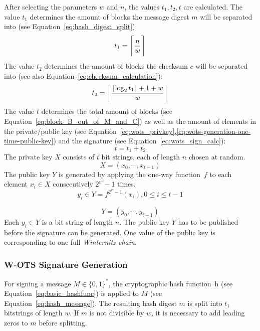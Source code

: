 After selecting the parameters $w$ and $n$, the values $t_1, t_2, t$ are calculated.
The value $t_1$ determines the amount of blocks the message digest $m$ will be separated into (see Equation~\ref{eq:hash_digest_split}):
\begin{equation}
\label{eq:t1}
t_1 = \ceil[\Bigg]{\frac{n}{w}}
\end{equation}
The value $t_2$ determines the amount of blocks the checksum $c$ will be separated into (see also Equation~\ref{eq:checksum_calculation}):
\begin{equation}
\label{eq:t2}
t_2 = \ceil*{\frac{\floor*{\log_2 t_1} + 1 + w}{w} }
\end{equation}
The value $t$ determines the total amount of blocks (see Equation~\ref{eq:block_B_out_of_M_and_C}) as well as the amount of elements in the private/public key (see Equation~\ref{eq:wots_privkey},\ref{eq:wots-generation-one-time-public-key}) and the signature (see Equation~\ref{eq:wots_sign_calc}):
\begin{equation}
\label{eq:t}
t = t_1 + t_2
\end{equation}
The private key $X$ consists of $t$ bit strings, each of length $n$ chosen at random.
\begin{equation}
\label{eq:wots_privkey}
X = (x_0, \cdots, x_{t-1})
\end{equation}
The public key $Y$ is generated by applying the one-way function~$f$ to each element $x_i  \in X$  consecutively $2^w - 1$ times. %
\begin{equation}
\label{eq:wots-generation-one-time-public-key}
y_i \in Y =  f^{2^w-1}(x_i), 0 \leq i \leq t-1 
\end{equation}

\begin{equation}
\label{eq:wots_pub_one-time-key}
Y = (y_0, \cdots, y_{t-1})
\end{equation}
Each $y_i \in Y$ is a bit string of length $n$. The public key $Y$ has to be published before the signature can be generated. One value of the public key is corresponding to one full \textit{Winternitz chain}. %

\subsubsection{W-OTS Signature Generation}
For signing a message $M \in \lbrace 0,1 \rbrace^*$, the cryptographic hash function~h (see Equation~\ref{eq:basic_hashfunc}) is applied to $M$ (see Equation~\ref{eq:hash_message}). The resulting hash digest $m$ is split into $t_1$ bitstrings of length $w$. If $m$ is not divisible by $w$, it is necessary to add leading zeros to $m$ before splitting.

